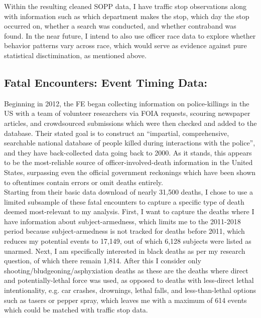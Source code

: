 \documentclass[12pt,a4paper]{article}
\begin{document}
Within the resulting cleaned SOPP data, I have traffic stop observations along with information such as which department makes the stop, which day the stop occurred on, whether a search was conducted, and whether contraband was found. In the near future, I intend to also use officer race data to explore whether behavior patterns vary across race, which would serve as evidence against pure statistical disctimination, as mentioned above. \\


\subsection{Fatal Encounters: Event Timing Data:}

Beginning in 2012, the FE began collecting information on police-killings in the US with a team of volunteer researchers via FOIA requests, scouring newspaper articles, and crowdsourced submissions which were then checked and added to the database. Their stated goal is to construct an ``impartial, comprehensive, searchable national database of people killed during interactions with the police'', and they have back-collected data going back to 2000. As it stands, this appears to be the most-reliable source of officer-involved-death information in the United States, surpassing even the official government reckonings which have been shown to oftentimes contain errors or omit deaths entirely. \\

Starting from their basic data download of nearly 31,500 deaths, I chose to use a limited subsample of these fatal encounters to capture a specific type of death deemed most-relevant to my analysis. First, I want to capture the deaths where I have information about subject-armedness, which limits me to the 2011-2018 period because subject-armedness is not tracked for deaths before 2011, which reduces my potential events to 17,149, out of which 6,128 subjects were listed as unarmed. Next, I am specifically interested in black deaths as per my research question, of which there remain 1,814. After this I consider only shooting/bludgeoning/asphyxiation deaths as these are the deaths where direct and potentially-lethal force was used, as opposed to deaths with less-direct lethal intentionality, e.g. car crashes, drownings, lethal falls, and less-than-lethal options such as tasers or pepper spray, which leaves me with a maximum of 614 events which could be matched with traffic stop data. \\
\end{document}
